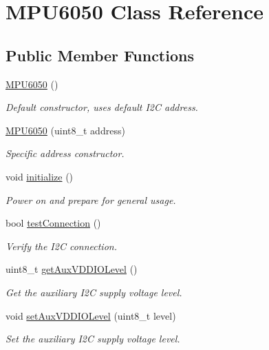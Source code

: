 \hypertarget{classMPU6050}{}\section{M\+P\+U6050 Class Reference}
\label{classMPU6050}
\subsection*{Public Member Functions}
\begin{DoxyCompactItemize}
\item 
\mbox{\hyperlink{classMPU6050_a7c0146d45537e4bd7a0d4c1c476fdab7}{M\+P\+U6050}} ()
\begin{DoxyCompactList}\small\item\em Default constructor, uses default I2C address. \end{DoxyCompactList}\item 
\mbox{\hyperlink{classMPU6050_a94df4ec1565317ba5279122b3bf7e056}{M\+P\+U6050}} (uint8\+\_\+t address)
\begin{DoxyCompactList}\small\item\em Specific address constructor. \end{DoxyCompactList}\item 
void \mbox{\hyperlink{classMPU6050_abd8fc6c18adf158011118fbccc7e7054}{initialize}} ()
\begin{DoxyCompactList}\small\item\em Power on and prepare for general usage. \end{DoxyCompactList}\item 
bool \mbox{\hyperlink{classMPU6050_a95ffab7b44fce3834236e0813687d11a}{test\+Connection}} ()
\begin{DoxyCompactList}\small\item\em Verify the I2C connection. \end{DoxyCompactList}\item 
uint8\+\_\+t \mbox{\hyperlink{classMPU6050_af6e9af8e2222889fd5458e2ae12c55c8}{get\+Aux\+V\+D\+D\+I\+O\+Level}} ()
\begin{DoxyCompactList}\small\item\em Get the auxiliary I2C supply voltage level. \end{DoxyCompactList}\item 
void \mbox{\hyperlink{classMPU6050_a7c666c20e26869bc80646f1b2c3d69bc}{set\+Aux\+V\+D\+D\+I\+O\+Level}} (uint8\+\_\+t level)
\begin{DoxyCompactList}\small\item\em Set the auxiliary I2C supply voltage level. \end{DoxyCompactList}\item 

\end{DoxyCompactItemize}
